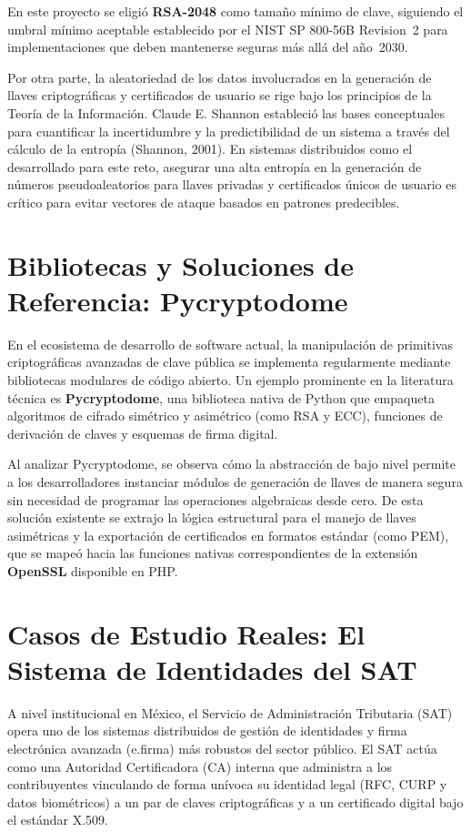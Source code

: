 \documentclass[10pt,letterpaper]{report}
\begin{document}
En este proyecto se eligió \textbf{RSA-2048} como tamaño mínimo de clave, siguiendo el umbral mínimo aceptable establecido por el NIST SP 800-56B Revision~2 para implementaciones que deben mantenerse seguras más allá del año~2030.

Por otra parte, la aleatoriedad de los datos involucrados en la generación de llaves criptográficas y certificados de usuario se rige bajo los principios de la Teoría de la Información. Claude E. Shannon estableció las bases conceptuales para cuantificar la incertidumbre y la predictibilidad de un sistema a través del cálculo de la entropía (Shannon, 2001). En sistemas distribuidos como el desarrollado para este reto, asegurar una alta entropía en la generación de números pseudoaleatorios para llaves privadas y certificados únicos de usuario es crítico para evitar vectores de ataque basados en patrones predecibles.

\section{Bibliotecas y Soluciones de Referencia: Pycryptodome}

En el ecosistema de desarrollo de software actual, la manipulación de primitivas criptográficas avanzadas de clave pública se implementa regularmente mediante bibliotecas modulares de código abierto. Un ejemplo prominente en la literatura técnica es \textbf{Pycryptodome}, una biblioteca nativa de Python que empaqueta algoritmos de cifrado simétrico y asimétrico (como RSA y ECC), funciones de derivación de claves y esquemas de firma digital.

Al analizar Pycryptodome, se observa cómo la abstracción de bajo nivel permite a los desarrolladores instanciar módulos de generación de llaves de manera segura sin necesidad de programar las operaciones algebraicas desde cero. De esta solución existente se extrajo la lógica estructural para el manejo de llaves asimétricas y la exportación de certificados en formatos estándar (como PEM), que se mapeó hacia las funciones nativas correspondientes de la extensión \textbf{OpenSSL} disponible en PHP.

\section{Casos de Estudio Reales: El Sistema de Identidades del SAT}

A nivel institucional en México, el Servicio de Administración Tributaria (SAT) opera uno de los sistemas distribuidos de gestión de identidades y firma electrónica avanzada (e.firma) más robustos del sector público. El SAT actúa como una Autoridad Certificadora (CA) interna que administra a los contribuyentes vinculando de forma unívoca su identidad legal (RFC, CURP y datos biométricos) a un par de claves criptográficas y a un certificado digital bajo el estándar X.509.
\end{document}
